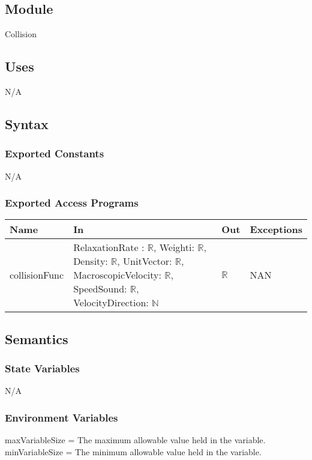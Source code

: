 \documentclass[12pt, titlepage]{article}
\begin{document}
\subsection{Module}

Collision

\subsection{Uses}
N/A

\subsection{Syntax}

\subsubsection{Exported Constants}
N/A

\subsubsection{Exported Access Programs}

\begin{center}
	\begin{tabular}{p{3cm} p{3cm} p{3cm} p{2cm}}
		\hline
		\textbf{Name} & \textbf{In} & \textbf{Out} & \textbf{Exceptions} \\
		\hline
		collisionFunc & RelaxationRate : $\mathbb{R}$, Weighti: $\mathbb{R}$, Density: $\mathbb{R}$, UnitVector: $\mathbb{R}$, MacroscopicVelocity: $\mathbb{R}$, SpeedSound: $\mathbb{R}$, VelocityDirection: $\mathbb{N}$ & $\mathbb{R}$ & NAN \\
		\hline
	\end{tabular}
\end{center}

\subsection{Semantics}

\subsubsection{State Variables}
N/A

\subsubsection{Environment Variables}
maxVariableSize = The maximum allowable value held in the variable.\\
minVariableSize = The minimum allowable value held in the variable.
\end{document}
